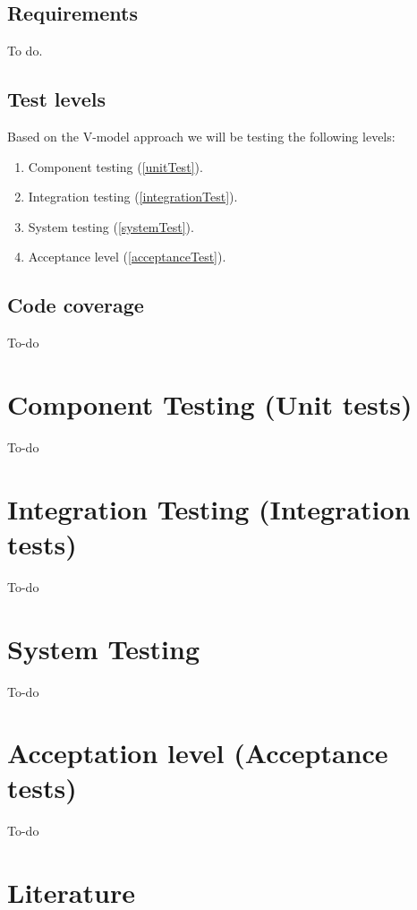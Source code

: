 \documentclass[signature]{deltares_report}
\begin{document}
\section{Requirements}
\label{sec:requirements}
To do.


\section{Test levels}
\label{sec:testLevels}
Based on the V-model approach we will be testing the following levels:
\begin{enumerate}
\item Component testing (\autoref{unitTest}).
\item Integration testing (\autoref{integrationTest}).
\item System testing (\autoref{systemTest}).
\item Acceptance level (\autoref{acceptanceTest}).
\end{enumerate}

\section{Code coverage}
\label{sec:codeCoverage}
To-do
\chapter{Component Testing (Unit tests)}
\label{unitTest}
To-do

\chapter{Integration Testing (Integration tests)}
\label{integrationTest}
To-do

\chapter{System Testing}
\label{systemTest}
To-do

\chapter{Acceptation level (Acceptance tests)}
\label{acceptanceTest}
To-do

\chapter{Literature}  \label{chapterLiterature}



\pagestyle{empty}
\mbox{}

\end{document}
